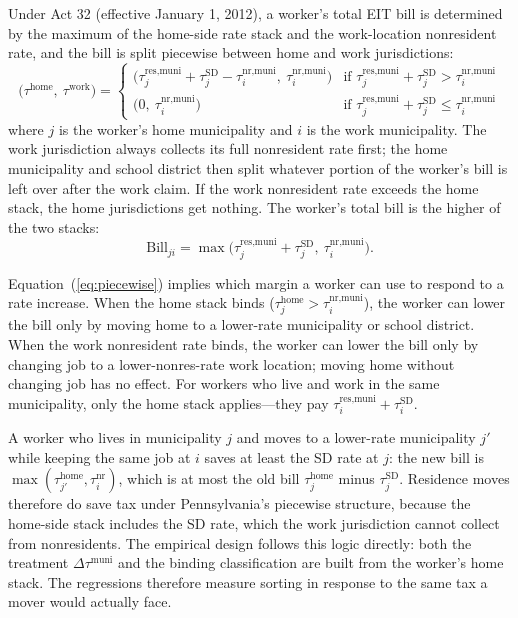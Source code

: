 \documentclass[12pt]{article}
\begin{document}
Under Act 32 (effective January 1, 2012), a worker's total EIT bill
is determined by the maximum of the home-side rate stack and the
work-location nonresident rate, and the bill is split piecewise
between home and work jurisdictions:
%
\begin{equation}
\bigl(\tau^{\text{home}},\ \tau^{\text{work}}\bigr) =
\begin{cases}
\bigl(\tau^{\text{res,muni}}_j + \tau^{\text{SD}}_j - \tau^{\text{nr,muni}}_i,\ \tau^{\text{nr,muni}}_i\bigr)
   & \text{if } \tau^{\text{res,muni}}_j + \tau^{\text{SD}}_j > \tau^{\text{nr,muni}}_i \\[4pt]
\bigl(0,\ \tau^{\text{nr,muni}}_i\bigr)
   & \text{if } \tau^{\text{res,muni}}_j + \tau^{\text{SD}}_j \leq \tau^{\text{nr,muni}}_i
\end{cases}
\label{eq:piecewise}
\end{equation}
%
where $j$ is the worker's home municipality and $i$ is the work municipality. The
work jurisdiction always collects its full nonresident rate first;
the home municipality and school district then split whatever portion of the
worker's bill is left over after the work claim. If the work nonresident
rate exceeds the home stack, the home jurisdictions get nothing. The
worker's total bill is the higher of the two stacks:
%
\begin{equation}
\text{Bill}_{ji} = \max\!\bigl(\tau^{\text{res,muni}}_j + \tau^{\text{SD}}_j,\ \tau^{\text{nr,muni}}_i\bigr).
\label{eq:bill}
\end{equation}

Equation~(\ref{eq:piecewise}) implies which margin a worker can use to
respond to a rate increase. When the home stack binds
($\tau^{\text{home}}_j > \tau^{\text{nr,muni}}_i$), the worker can lower
the bill only by moving home to a lower-rate municipality or school district.
When the work nonresident rate binds, the worker can lower the bill
only by changing job to a lower-nonres-rate work location; moving home
without changing job has no effect. For workers who live and work in
the same municipality, only the home stack applies---they pay
$\tau^{\text{res,muni}}_i + \tau^{\text{SD}}_i$.

A worker who lives in municipality $j$ and moves to a lower-rate municipality $j'$
while keeping the same job at $i$ saves at least the SD rate at $j$:
the new bill is $\max(\tau^{\text{home}}_{j'}, \tau^{\text{nr}}_i)$,
which is at most the old bill $\tau^{\text{home}}_j$ minus
$\tau^{\text{SD}}_j$. Residence moves therefore do save tax under
Pennsylvania's piecewise structure, because the home-side stack
includes the SD rate, which the work jurisdiction cannot collect
from nonresidents. The empirical design follows this logic directly: both the treatment
$\Delta\tau^{\text{muni}}$ and the binding classification are
built from the worker's home stack. The regressions therefore measure
sorting in response to the same tax a mover would actually face.
\end{document}
